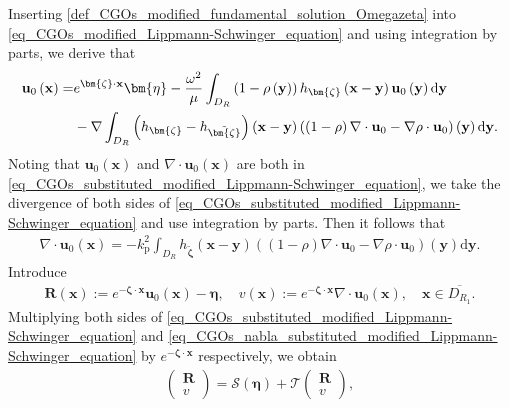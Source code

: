 \documentclass[11pt,reqno,oneside]{amsart}
\theoremstyle{definition}
\theoremstyle{remark}
\numberwithin{equation}{section}
\numberwithin{equation}{section}
\theoremstyle{remark}
\begin{document}
Inserting \eqref{def_CGOs_modified_fundamental_solution_Omegazeta} into \eqref{eq_CGOs_modified_Lippmann-Schwinger_equation} and using integration by parts, we derive that
\begin{align} \label{eq_CGOs_substituted_modified_Lippmann-Schwinger_equation}
	\mathbf{u}_0\left(\mathbf{x}\right) = & e^{\bm{\zeta}\cdot\mathbf{x}} \bm{\eta}-\frac{\omega^2}{\mu} \int_{D_R}\left(1-\rho\left(\mathbf{y}\right)\right) h_{\bm{\zeta}}\left(\mathbf{x} - \mathbf{y}\right) \mathbf{u}_0\left(\mathbf{y}\right) \mathrm{d} \mathbf{y} \notag \\
	& - \nabla \int_{D_R}\left(h_{\bm{\zeta}}-h_{\tilde{\bm{\zeta}}}\right)\left(\mathbf{x} - \mathbf{y}\right)\left(\left(1-\rho\right) \nabla \cdot \mathbf{u}_0-\nabla \rho \cdot \mathbf{u}_0\right)\left(\mathbf{y}\right) \mathrm{d} \mathbf{y}.
\end{align}
Noting that $ \mathbf{u}_0\left(\mathbf{x}\right) $ and $ \nabla \cdot \mathbf{u}_0\left(\mathbf{x}\right) $ are both in \eqref{eq_CGOs_substituted_modified_Lippmann-Schwinger_equation}, we take the divergence of both sides of \eqref{eq_CGOs_substituted_modified_Lippmann-Schwinger_equation} and use integration by parts. Then it follows that
\begin{align} \label{eq_CGOs_nabla_substituted_modified_Lippmann-Schwinger_equation}
	\nabla \cdot \mathbf{u}_0\left(\mathbf{x}\right) = - k_{\mathrm{p}}^2 \int_{D_R} h_{\tilde{\bm{\zeta}}}\left(\mathbf{x} - \mathbf{y}\right)((1-\rho) \nabla \cdot \mathbf{u}_0-\nabla \rho \cdot \mathbf{u}_0)\left(\mathbf{y}\right) \mathrm{d} \mathbf{y}.
\end{align}
Introduce 
\begin{align} \label{def_CGOs_R_v} 
	\mathbf{R}\left(\mathbf{x}\right) := e^{-\bm{\zeta} \cdot \mathbf{x}} \mathbf{u}_0\left(\mathbf{x}\right) - \bm{\eta}, \quad v\left(\mathbf{x}\right) := e^{-\bm{\zeta} \cdot \mathbf{x}} \nabla \cdot \mathbf{u}_0\left(\mathbf{x}\right) , \quad \mathbf{x} \in \overline{D_{R_1}}.
\end{align}
Multiplying both sides of \eqref{eq_CGOs_substituted_modified_Lippmann-Schwinger_equation} and \eqref{eq_CGOs_nabla_substituted_modified_Lippmann-Schwinger_equation} by $ e^{-\bm{\zeta} \cdot \mathbf{x}} $ respectively, we obtain 
\begin{align} \label{eq_CGOs_Rv=S+T}
	\begin{pmatrix}
		\mathbf{R} \\
		v
	\end{pmatrix}
	= \mathcal{S}\left(\bm{\eta}\right) + \mathcal{T} 
	\begin{pmatrix}
		\mathbf{R} \\
		v
	\end{pmatrix},
\end{align}
\end{document}
